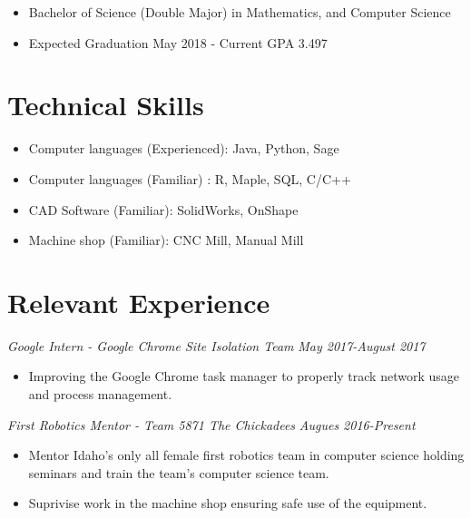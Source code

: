 \documentclass[letterpaper]{article}
\begin{document}
\begin{itemize}
\item Bachelor of Science (Double Major) in  Mathematics, and Computer Science


\item Expected Graduation May 2018 - Current GPA 3.497
\end{itemize}

\vspace{.10in}
\section*{Technical Skills}
\begin{itemize}
\item Computer languages (Experienced): Java, Python, Sage 
\item Computer languages (Familiar) : R, Maple, SQL, C/C++
\item CAD Software (Familiar): SolidWorks, OnShape
\item Machine shop (Familiar): CNC Mill, Manual Mill
\end{itemize}

\vspace{.10in}
\section*{Relevant Experience}

\begin{multicols}{2}
\textit{Google Intern - Google Chrome Site Isolation Team}
\vfill
\columnbreak
\textit{May 2017-August 2017}
\end{multicols}
\begin{itemize}
    \item Improving the Google Chrome task manager to properly track network usage and process management.
\end{itemize}

\vspace{.10in}

\begin{multicols}{2}
\textit{First Robotics Mentor - Team 5871 The Chickadees}
\vfill
\columnbreak
\textit{Augues 2016-Present}
\end{multicols}
\begin{itemize}
    \item Mentor Idaho's only all female first robotics team in computer science holding seminars
        and train the team's computer science team.
    \item Suprivise work in the machine shop ensuring safe use of the equipment. 
\end{itemize}
\end{document}
